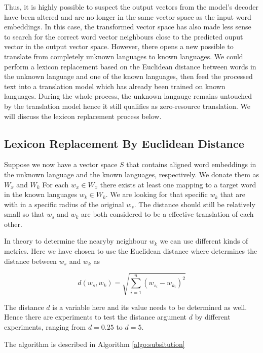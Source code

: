 \documentclass[thesis,fonts=libertine]{cluu}
\begin{document}
Thus, it is highly possible to suspect the output vectors from the model's decoder have been altered and are no longer in the same vector space as the input word embeddings. In this case, the transformed vector space has also made less sense to search for the correct word vector neighbours close to the predicted ouput vector in the output vector space. However, there opens a new possible to translate from completely unknown languages to known languages. We could perform a lexicon replacement based on the Euclidean distance between words in the unknown language and one of the known languages, then feed the processed text into a translation model which has already been trained on known languages. During the whole process, the unknown langauge remains untouched by the translation model hence it still qualifies as zero-resource translation. We will discuss the lexicon replacement process below.

\subsection{Lexicon Replacement By Euclidean Distance}

Suppose we now have a vector space $S$ that contains aligned word embeddings in the unknown language and the known languages, respectively. We donate them as $W_x$ and $W_k$ For each $w_x\in W_x$ there exists at least one mapping to a target word in the known languages $w_k \in W_k$. We are looking for that specific $w_k$ that are with in a specific radius of the original $w_s$. The distance should still be relatively small so that $w_s$ and $w_k$ are both considered to be a effective translation of each other.

In theory to determine the nearyby neighbour $w_k$ we can use different kinds of metrics. Here we have chosen to use the Euclidean distance where determines the distance between $w_s$ and $w_k$ as

\begin{equation}
  d(w_s, w_k)=\sqrt{\sum_{i=1}^n{(w_{s_i}-w_{k_i})}^2}
\end{equation}

The distance $d$ is a variable here and its value needs to be determined as well. Hence there are experiments to test the distance argument $d$ by different experiments, ranging from $d=0.25$ to $d=5$.

The algorithm is described in Algorithm \ref{algo:subsitution}
\end{document}
